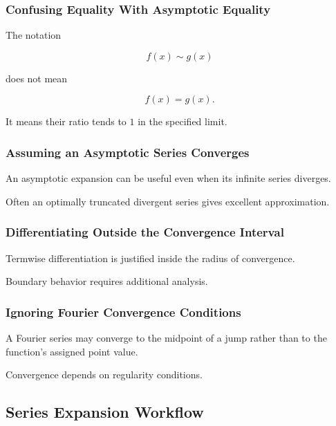 \subsubsection{Confusing Equality With Asymptotic Equality}

The notation

\[
f(x)\sim g(x)
\]

does not mean

\[
f(x)=g(x).
\]

It means their ratio tends to \(1\) in the specified limit.

\subsubsection{Assuming an Asymptotic Series Converges}

An asymptotic expansion can be useful even when its infinite series diverges.

Often an optimally truncated divergent series gives excellent approximation.

\subsubsection{Differentiating Outside the Convergence Interval}

Termwise differentiation is justified inside the radius of convergence.

Boundary behavior requires additional analysis.

\subsubsection{Ignoring Fourier Convergence Conditions}

A Fourier series may converge to the midpoint of a jump rather than to the
function's assigned point value.

Convergence depends on regularity conditions.

\subsection{Series Expansion Workflow}
\label{subsec:series-expansion-workflow}

